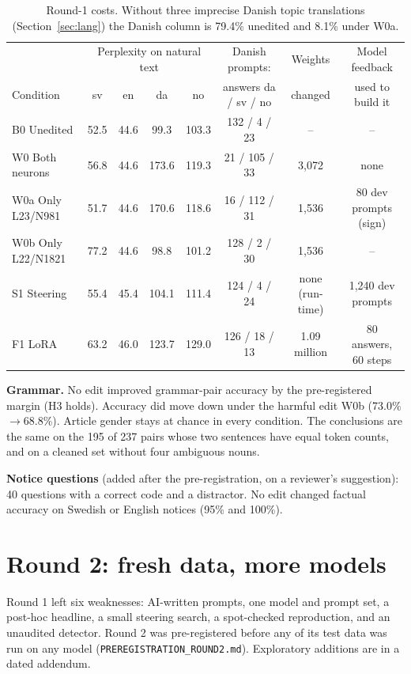 \documentclass[10pt,a4paper]{article}
\newcommand{\code}[1]{{\small\texttt{#1}}}
\newcommand{\up}{$\rightarrow$}
\begin{document}
\begin{table}[H]\footnotesize\centering\setlength{\tabcolsep}{4pt}
\begin{tabular}{@{}lccccccc@{}}
\toprule
 & \multicolumn{4}{c}{Perplexity on natural text} & Danish prompts: & Weights & Model feedback\\
Condition & sv & en & da & no & answers da / sv / no & changed & used to build it\\
\midrule
B0 Unedited & 52.5 & 44.6 & 99.3 & 103.3 & 132 / 4 / 23 & -- & --\\
W0 Both neurons & 56.8 & 44.6 & 173.6 & 119.3 & 21 / 105 / 33 & 3,072 & none\\
W0a Only L23/N981 & 51.7 & 44.6 & 170.6 & 118.6 & 16 / 112 / 31 & 1,536 & 80 dev prompts (sign)\\
W0b Only L22/N1821 & 77.2 & 44.6 & 98.8 & 101.2 & 128 / 2 / 30 & 1,536 & --\\
S1 Steering & 55.4 & 45.4 & 104.1 & 111.4 & 124 / 4 / 24 & none (run-time) & 1,240 dev prompts\\
F1 LoRA & 63.2 & 46.0 & 123.7 & 129.0 & 126 / 18 / 13 & 1.09 million & 80 answers, 60 steps\\
\bottomrule
\end{tabular}
\caption{Round-1 costs. Without three imprecise Danish topic translations (Section~\ref{sec:lang}) the Danish column is 79.4\% unedited and 8.1\% under W0a.}\label{tab:regress}
\end{table}

\textbf{Grammar.} No edit improved grammar-pair accuracy by the pre-registered margin (H3 holds). Accuracy did move down under the harmful edit W0b (73.0\%\up68.8\%). Article gender stays at chance in every condition.
The conclusions are the same on the 195 of 237 pairs whose two sentences have equal token counts, and on a cleaned set without four ambiguous nouns.

\textbf{Notice questions} (added after the pre-registration, on a reviewer's suggestion): 40 questions with a correct code and a distractor. No edit changed factual accuracy on Swedish or English notices (95\% and 100\%).

\section{Round 2: fresh data, more models}\label{sec:r2}

Round 1 left six weaknesses: AI-written prompts, one model and prompt set, a post-hoc headline, a small steering search, a spot-checked reproduction, and an unaudited detector.
Round 2 was pre-registered before any of its test data was run on any model (\code{PREREGISTRATION\_\allowbreak ROUND2.md}). Exploratory additions are in a dated addendum.
\end{document}
